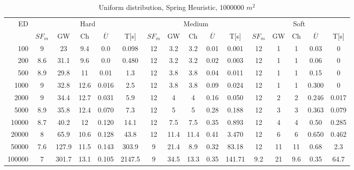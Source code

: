\begin{table}[htb]
    \centering
    \begin{tabular}{|r|c|c|c|c|c|c|c|c|c|c|c|c|c|c|c|}
        \hline          
          \multirow{2}{*}{ED} & \multicolumn{5}{c|}{Hard} & \multicolumn{5}{c|}{Medium} &\multicolumn{5}{c|}{Soft} \\
           \cline{2-16}
         &$SF_{m}$&GW & Ch & $\overline{U}$&T[s] &$SF_{m}$&GW & Ch & $\overline{U}$ &T[s] &$SF_{m}$&GW & Ch & $\overline{U}$  & T[s]  \\
         \hline
      100 &9  &23   &9.4  &0.0 &0.098   &12&3.2 &3.2 &0.01 &0.001  &12 &1 &1  &0.03&0\\
      200 &8.6&31.1 &9.6  &0.0 &0.480   &12&3.2 &3.2 &0.02 &0.003  &12 &1  &1 &0.06&0\\
      500 &8.9&29.8 &11   &0.01 &1.3    &12&3.8 &3.8 &0.04 &0.011  &12 &1 &1  &0.15&0\\
     1000 &9  &32.8 &12.6 &0.016 &2.5   &12&3.8 &3.8 &0.09 &0.024  &12 &1 &1  &0.300 &0\\
     2000 &9  &34.4 &12.7 &0.031 &5.9   &12&4   &4   &0.16 &0.050  &12 &2 &2  &0.246&0.017\\
     5000 &8.9&35.8 &12.4 &0.070 &7.3   &12&5   &5   &0.28 &0.188  &12 &3&3   &0.363&0.079\\
    10000 &8.7&40.2 &12   &0.120 &14.1  &12&7.5 &7.5 &0.35 &0.893  &12 &4&4   &0.50&0.285\\
    20000 &8  &65.9 &10.6 &0.128 &43.8  &12&11.4&11.4&0.41 &3.470  &12 &6 &6  &0.650&0.462\\
    50000 &7.6&127.9&11.5 &0.143 &303.9 &9 &21.4&8.9 &0.32 &83.18  &12 &11&11 &0.68&2.3\\
   100000 &7  &301.7&13.1 &0.105 &2147.5&9 &34.5&13.3&0.35&141.71  &9.2&21&9.6&0.35&64.7\\
     \hline
\end{tabular}
    \caption{Uniform distribution, Spring Heuristic, 1000000 $m^2$}
    \label{tab:UnSpr1000}
\end{table}